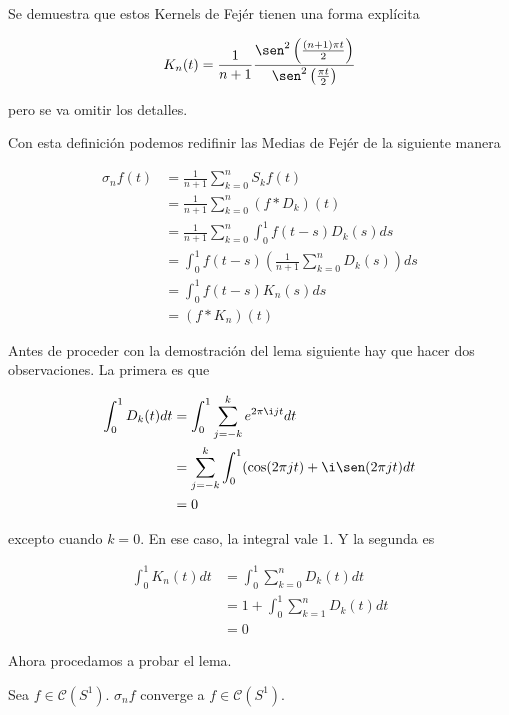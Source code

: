Se demuestra que estos Kernels de Fejér tienen una forma explícita

\begin{equation}
	K_n(t) = \frac{1}{n+1} \frac{\sen^2 \left( \frac{(n+1)\pi t}{2} \right)}{\sen^2 \left( \frac{\pi t}{2} \right)}
\end{equation}

pero se va omitir los detalles.

Con esta definición podemos redifinir las Medias de Fejér de la siguiente manera

\begin{align}
	\sigma_n f(t) &= \frac{1}{n+1} \sum_{k=0}^{n} S_k f(t)\\
	&= \frac{1}{n+1} \sum_{k=0}^{n} (f * D_k)(t)\\
	&= \frac{1}{n+1} \sum_{k=0}^{n} \int_{0}^{1} f(t-s) D_k(s) ds\\
	&= \int_{0}^{1} f(t-s) \left( \frac{1}{n+1} \sum_{k=0}^{n} D_k(s) \right) ds\\
	&= \int_{0}^{1} f(t-s) K_n(s) ds\\
	&= (f * K_n)(t)
\end{align}

Antes de proceder con la demostración del lema siguiente hay que hacer dos observaciones. La primera es que

\begin{align}
	\int_{0}^{1} D_k(t) dt &= \int_{0}^{1} \sum_{j=-k}^{k}  e^{2\pi \i jt} dt\\
	&= \sum_{j=-k}^{k} \int_{0}^{1} (\cos(2\pi jt) + \i \sen(2\pi jt) dt\\
	&= 0
\end{align}

excepto cuando $k=0$. En ese caso, la integral vale $1$. Y la segunda es

\begin{align}
	\int_{0}^{1} K_n(t) dt &= \int_{0}^{1} \sum_{k=0}^{n} D_k(t) dt\\
	&= 1+ \int_{0}^{1} \sum_{k=1}^{n} D_k(t) dt\\
	&= 0
\end{align}

Ahora procedamos a probar el lema.

\begin{lema}\label{sigmanf}
	Sea $f \in \mathcal{C}(S^1)$. $\sigma_n f$ converge a $f \in \mathcal{C}(S^1)$.
\end{lema}

